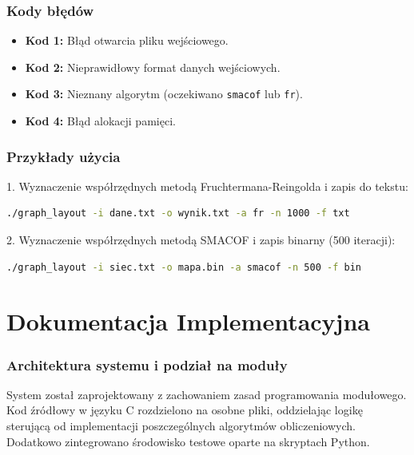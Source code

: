 \documentclass[12pt,a4paper]{article}
\begin{document}
\section{Kody błędów}
\begin{itemize}
    \item \textbf{Kod 1:} Błąd otwarcia pliku wejściowego.
    \item \textbf{Kod 2:} Nieprawidłowy format danych wejściowych.
    \item \textbf{Kod 3:} Nieznany algorytm (oczekiwano \texttt{smacof} lub \texttt{fr}).
    \item \textbf{Kod 4:} Błąd alokacji pamięci.
\end{itemize}

\section{Przykłady użycia}

1. Wyznaczenie współrzędnych metodą Fruchtermana-Reingolda i zapis do tekstu:
\begin{lstlisting}[language=bash]
./graph_layout -i dane.txt -o wynik.txt -a fr -n 1000 -f txt
\end{lstlisting}

2. Wyznaczenie współrzędnych metodą SMACOF i zapis binarny (500 iteracji):
\begin{lstlisting}[language=bash]
./graph_layout -i siec.txt -o mapa.bin -a smacof -n 500 -f bin
\end{lstlisting}

\newpage
\part{Dokumentacja Implementacyjna}

\section{Architektura systemu i podział na moduły}
System został zaprojektowany z zachowaniem zasad programowania modułowego. Kod źródłowy w języku C rozdzielono na osobne pliki, oddzielając logikę sterującą od implementacji poszczególnych algorytmów obliczeniowych. Dodatkowo zintegrowano środowisko testowe oparte na skryptach Python.
\end{document}
